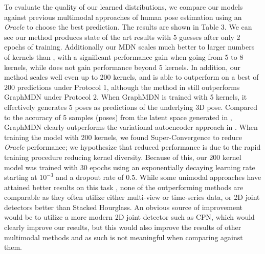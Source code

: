 To evaluate the quality of our learned distributions, we compare our models against previous multimodal approaches of human pose estimation \cite{jahangiri2017generating, Li_2019_CVPR,Sharma_2019_ICCV} using an \textit{Oracle} to choose the best prediction. The results are shown in Table 3. We can see our method produces state of the art results with 5 guesses after only 2 epochs of training. Additionally our MDN scales much better to larger numbers of kernels than \cite{Li_2019_CVPR}, with a significant performance gain when going from 5 to 8 kernels, while \cite{Li_2019_CVPR} does not gain performance beyond 5 kernels. In addition, our method scales well even up to 200 kernels, and is able to outperform \cite{Sharma_2019_ICCV} on a best of 200 predictions under Protocol 1, although the method in \cite{Sharma_2019_ICCV}
still outperforms GraphMDN under Protocol 2. When GraphMDN is trained with 5 kernels, it effectively generates 5 poses as predictions of the underlying 3D pose. Compared to the accuracy of 5 samples (poses) from the latent space generated in \cite{Sharma_2019_ICCV}, GraphMDN clearly outperforms the variational autoencoder approach in \cite{Sharma_2019_ICCV}. When training the model with 200 kernels, we found Super-Convergence to reduce \textit{Oracle} performance; we hypothesize that reduced performance is due to the rapid training procedure reducing kernel diversity. Because of this, our 200 kernel model was trained with 30 epochs using an exponentially decaying learning rate starting at $10^{-3}$ and a dropout rate of 0.5. While some unimodal approaches have attained better results on this task \cite{Iskakov_triangulation, pavllo20193d, Qiu_2019_ICCV}, none of the outperforming methods are comparable as they often utilize either multi-view or time-series data, or 2D joint detectors better than Stacked Hourglass. An obvious source of improvement would be to utilize a more modern 2D joint detector such as CPN\cite{pavllo20193d}, which would clearly improve our results, but this would also improve the results of other multimodal methods and as such is not meaningful when comparing against them.

